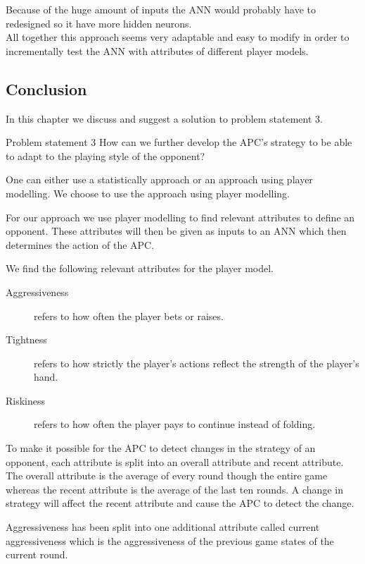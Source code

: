Because of the huge amount of inputs the ANN would probably have to redesigned so it have more hidden neurons.\\

All together this approach seems very adaptable and easy to modify in order to incrementally test the ANN with attributes of different player models.


\subsection{Conclusion}
In this chapter we discuss and suggest a solution to problem statement 3.

\vspace{4mm}
\begin{statementBox2}{Problem statement 3}
How can we further develop the APC's strategy to be able to adapt to the playing style of the opponent?
\end{statementBox2}
\vspace{4mm} 

One can either use a statistically approach or an approach using player modelling. We choose to use the approach using player modelling. 

For our approach we use player modelling to find relevant attributes to define an opponent. These attributes will then be given as inputs to an ANN which then determines the action of the APC. 

We find the following relevant attributes for the player model.

\begin{description}
\item[Aggressiveness] refers to how often the player bets or raises.
\item[Tightness] refers to how strictly the player's actions reflect the strength of the player's hand.
\item[Riskiness] refers to how often the player pays to continue instead of folding.
\end{description}

To make it possible for the APC to detect changes in the strategy of an opponent, each attribute is split into an overall attribute and recent attribute. The overall attribute is the average of every round though the entire game whereas the recent attribute is the average of the last ten rounds. A change in strategy will affect the recent attribute and cause the APC to detect the change.

Aggressiveness has been split into one additional attribute called current aggressiveness which is the aggressiveness of the previous game states of the current round.

